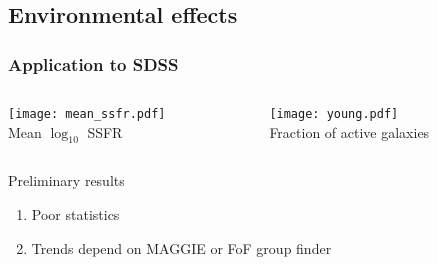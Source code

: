 \subsection{Environmental effects}
\begin{frame}
    \frametitle{Application to SDSS}

    \begin{columns}
        \begin{column}{0.59\linewidth}
            \centering
            \texttt{[image: mean\_ssfr.pdf]}\\
            Mean $\log_{10}$ SSFR
        \end{column}
        \begin{column}{0.59\linewidth}
            \centering
            \texttt{[image: young.pdf]}\\
            Fraction of active galaxies
        \end{column}
    \end{columns}
    \begin{block}{Preliminary results}
        \begin{enumerate}
            \item<1-> Poor statistics
            \item<2-> Trends depend on MAGGIE or FoF group finder
        \end{enumerate}
    \end{block}
\end{frame}
